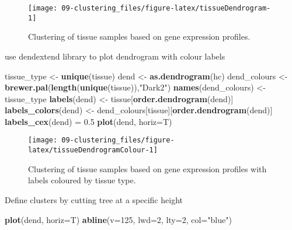 \documentclass[]{book}
\newenvironment{Shaded}{\begin{snugshade}}{\end{snugshade}}
\newcommand{\KeywordTok}[1]{\textcolor[rgb]{0.13,0.29,0.53}{\textbf{{#1}}}}
\newcommand{\DataTypeTok}[1]{\textcolor[rgb]{0.13,0.29,0.53}{{#1}}}
\newcommand{\DecValTok}[1]{\textcolor[rgb]{0.00,0.00,0.81}{{#1}}}
\newcommand{\FloatTok}[1]{\textcolor[rgb]{0.00,0.00,0.81}{{#1}}}
\newcommand{\StringTok}[1]{\textcolor[rgb]{0.31,0.60,0.02}{{#1}}}
\newcommand{\NormalTok}[1]{{#1}}
\theoremstyle{definition}
\theoremstyle{definition}
\theoremstyle{definition}
\theoremstyle{remark}
\begin{document}
\begin{figure}

{\centering \texttt{[image: 09-clustering\_files/figure-latex/tissueDendrogram-1]} 

}

\caption{Clustering of tissue samples based on gene expression profiles. }\label{fig:tissueDendrogram}
\end{figure}

use dendextend library to plot dendrogram with colour labels

\begin{Shaded}
\begin{Highlighting}[]
\NormalTok{tissue_type <-}\StringTok{ }\KeywordTok{unique}\NormalTok{(tissue)}
\NormalTok{dend <-}\StringTok{ }\KeywordTok{as.dendrogram}\NormalTok{(hc)}
\NormalTok{dend_colours <-}\StringTok{ }\KeywordTok{brewer.pal}\NormalTok{(}\KeywordTok{length}\NormalTok{(}\KeywordTok{unique}\NormalTok{(tissue)),}\StringTok{"Dark2"}\NormalTok{)}
\KeywordTok{names}\NormalTok{(dend_colours) <-}\StringTok{ }\NormalTok{tissue_type}
\KeywordTok{labels}\NormalTok{(dend) <-}\StringTok{ }\NormalTok{tissue[}\KeywordTok{order.dendrogram}\NormalTok{(dend)]}
\KeywordTok{labels_colors}\NormalTok{(dend) <-}\StringTok{ }\NormalTok{dend_colours[tissue][}\KeywordTok{order.dendrogram}\NormalTok{(dend)]}
\KeywordTok{labels_cex}\NormalTok{(dend) =}\StringTok{ }\FloatTok{0.5}
\KeywordTok{plot}\NormalTok{(dend, }\DataTypeTok{horiz=}\NormalTok{T)}
\end{Highlighting}
\end{Shaded}

\begin{figure}

{\centering \texttt{[image: 09-clustering\_files/figure-latex/tissueDendrogramColour-1]} 

}

\caption{Clustering of tissue samples based on gene expression profiles with labels coloured by tissue type. }\label{fig:tissueDendrogramColour}
\end{figure}

Define clusters by cutting tree at a specific height

\begin{Shaded}
\begin{Highlighting}[]
\KeywordTok{plot}\NormalTok{(dend, }\DataTypeTok{horiz=}\NormalTok{T)}
\KeywordTok{abline}\NormalTok{(}\DataTypeTok{v=}\DecValTok{125}\NormalTok{, }\DataTypeTok{lwd=}\DecValTok{2}\NormalTok{, }\DataTypeTok{lty=}\DecValTok{2}\NormalTok{, }\DataTypeTok{col=}\StringTok{"blue"}\NormalTok{)}
\end{Highlighting}
\end{Shaded}
\end{document}

